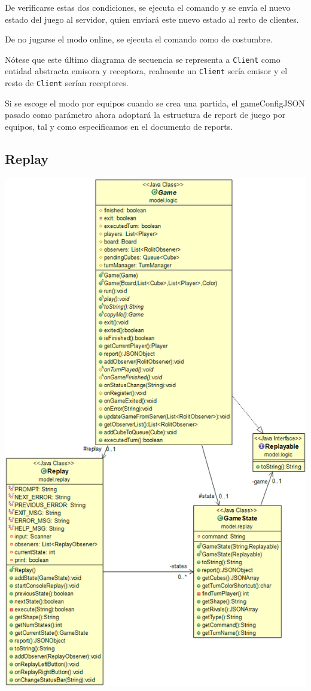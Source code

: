 \documentclass[12pt,a4paper,openright]{book}
\theoremstyle{break}
\begin{document}
De verificarse estas dos condiciones, se ejecuta el comando y se envía el nuevo estado del juego al servidor, quien enviará este nuevo estado al resto de clientes.

De no jugarse el modo online, se ejecuta el comando como de costumbre.

Nótese que este último diagrama de secuencia se representa a \texttt{Client} como entidad abstracta emisora y receptora, realmente un \texttt{Client} sería emisor y el resto de \texttt{Client} serían receptores.

Si se escoge el modo por equipos cuando se crea una partida, el gameConfigJSON pasado como parámetro ahora adoptará la estructura de report de juego por equipos, tal y como especificamos en el documento de reports.

\subsection{Replay}
\newpage
\begin{center}
\includegraphics[scale=0.57]{mementoreplay.png}
\end{center}
\end{document}

